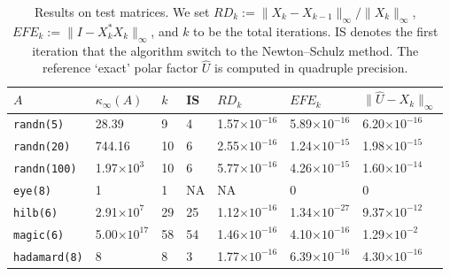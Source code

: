 \documentclass[12pt]{article}
\def\norm#1{\|#1\|}
\def\t#1{\texttt{\upshape #1}}
\begin{document}
\begin{table}[ht]

	\begin{center}
				\caption{Results on test matrices. We set 
				$RD_k:=\norm{X_k-X_{k-1}}_\infty/\norm{X_k}_\infty$, 
				$EFE_k:=\norm{I-X_k^*{X_k}}_\infty$, and $k$ to be the total 
				iterations. IS denotes the first iteration that the algorithm switch 
				to the Newton--Schulz method. The reference `exact' polar factor 
				$\widehat{U}$ is computed in quadruple precision.}
		\begin{tabular}{lllllll} 
			\hline
			 $A$ & $\kappa_\infty(A)$ &  $k$ & IS & $RD_k$  & $EFE_k$ &  
			 $\norm{\widehat{U}-X_k}_\infty$ \\
			\hline
		    \t{randn(5)} &  28.39 & 9 & 4 & 1.57$\times 10^{-16}$ & 5.89$\times 
		    10^{-16}$ &  6.20$\times 10^{-16}$   \\
		   \t{randn(20)} & 744.16 & 10 & 6 & 2.55$\times 10^{-16}$ & 1.24$\times 
		   10^{-15}$ & 1.98$\times 10^{-15}$ \\
		   \t{randn(100)}& 1.97$\times 10^{3}$ &10 & 6&  5.77$\times 10^{-16}$& 
		   4.26$\times 10^{-15}$ & 1.60$\times 10^{-14}$ \\
		   \t{eye(8)}    & 1 & 1 & NA & NA&  0 & 0 \\
		   \t{hilb(6)}   & 2.91$\times 10^{7}$& 29 & 25 & 1.12$\times 10^{-16}$ & 1.34$\times 10^{-27}$ & 9.37$\times 10^{-12}$ \\
		   \t{magic(6)}  & 5.00$\times 10^{17}$& 58 & 54 & 1.46$\times 10^{-16}$ & 
		   4.10$\times 10^{-16}$ & 1.29$\times 10^{-2}$ \\
		   \t{hadamard(8)} &  8 & 8 & 3 & 1.77$\times 10^{-16}$ &  6.39$\times 
		   10^{-16}$ & 4.30$\times 10^{-16}$ \\	
			\hline		
		\end{tabular}
		\label{table}
	\end{center}
\end{table}
\end{document}
